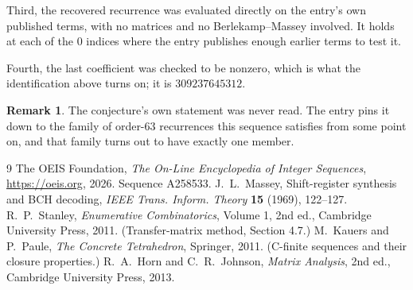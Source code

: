 \documentclass[11pt,a4paper]{article}
\theoremstyle{plain}
\theoremstyle{definition}
\newtheorem{remark}[theorem]{Remark}
\begin{document}
Third, the recovered recurrence was evaluated directly on the entry's own published terms, with
no matrices and no Berlekamp--Massey involved. It holds at each of the $0$ indices where
the entry publishes enough earlier terms to test it.

Fourth, the last coefficient was checked to be nonzero, which is what the identification above
turns on; it is $309237645312$.

\begin{remark}
The conjecture's own statement was never read. The entry pins it down to the family of
order-$63$ recurrences this sequence satisfies from some point on, and that family turns
out to have exactly one member.
\end{remark}

\begin{thebibliography}{9}
 The OEIS Foundation, \emph{The On-Line Encyclopedia of Integer
Sequences}, \url{https://oeis.org}, 2026. Sequence A258533.
 J.~L.~Massey, Shift-register synthesis and BCH decoding, \emph{IEEE
Trans. Inform. Theory} \textbf{15} (1969), 122--127.
 R.~P.~Stanley, \emph{Enumerative Combinatorics}, Volume 1, 2nd ed.,
Cambridge University Press, 2011. (Transfer-matrix method, Section 4.7.)
 M.~Kauers and P.~Paule, \emph{The Concrete Tetrahedron}, Springer, 2011.
(C-finite sequences and their closure properties.)
 R.~A.~Horn and C.~R.~Johnson, \emph{Matrix Analysis}, 2nd ed., Cambridge
University Press, 2013.
\end{thebibliography}
\end{document}
